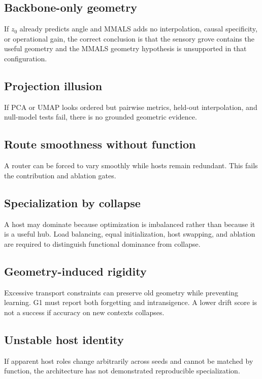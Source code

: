 \documentclass[11pt,a4paper]{article}
\begin{document}
\subsection{Backbone-only geometry}

If \(z_0\) already predicts angle and MMALS adds no interpolation, causal specificity, or operational gain, the correct conclusion is that the sensory grove contains the useful geometry and the MMALS geometry hypothesis is unsupported in that configuration.

\subsection{Projection illusion}

If PCA or UMAP looks ordered but pairwise metrics, held-out interpolation, and null-model tests fail, there is no grounded geometric evidence.

\subsection{Route smoothness without function}

A router can be forced to vary smoothly while hosts remain redundant. This fails the contribution and ablation gates.

\subsection{Specialization by collapse}

A host may dominate because optimization is imbalanced rather than because it is a useful hub. Load balancing, equal initialization, host swapping, and ablation are required to distinguish functional dominance from collapse.

\subsection{Geometry-induced rigidity}

Excessive transport constraints can preserve old geometry while preventing learning. G1 must report both forgetting and intransigence. A lower drift score is not a success if accuracy on new contexts collapses.

\subsection{Unstable host identity}

If apparent host roles change arbitrarily across seeds and cannot be matched by function, the architecture has not demonstrated reproducible specialization.
\end{document}
